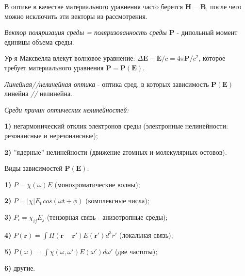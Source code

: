 В оптике в качестве материального уравнения часто берется $\mathbf{H}=\mathbf{B}$, после чего можно исключить эти векторы из рассмотрения.

\begin{to_def}
    \textit{Вектор поляризация среды = поляризованность среды $\mathbf{P}$} - дипольный момент единицы объема среды.
\end{to_def}

Ур-я Максвелла влекут волновое уравнение: $\Delta \mathbf{E}-\ddot{\mathbf{E}}/c=4\pi \mathbf{P}/c^{2}$, которое требует материального уравнения $\mathbf{P} = \mathbf{P}(\mathbf{E})$.

\begin{to_def}
    \textit{Линейная//нелинейная оптика} - оптика сред, в которых зависимость $\mathbf{P}(\mathbf{E})$ линейна \textit{//} нелинейна.
\end{to_def}

\textit{Среди причин оптических нелинейностей:} \\
    \par \textbf{1)} негармонический отклик электронов среды (электронные нелинейности: резонансные и нерезонансные); \\
    \par \textbf{2)} ''ядерные'' нелинейности (движение атомных и молекулярных остовов).


Виды зависимостей $\mathbf{P}(\mathbf{E})$: \\
     \par \textbf{1)} $P=\chi (\omega) E$ (монохроматические волны); \\
     \par \textbf{2)} $P=|\chi|E_{0}cos(\omega t + \phi)$ (комплексные числа); \\
     \par \textbf{3)} $P_{i}=\chi_{ij}E_{j}$ (тензорная связь - анизотропные среды); \\
     \par \textbf{4)} $P(\mathbf{r}) = \int H(\mathbf{r}-\mathbf{r}') E(\mathbf{r}') d^{3}r'$ (локальная связь); \\
     \par \textbf{5)} $P(\omega) = \int \chi (\omega, \omega') E(\omega') d\omega'$ (две частоты); \\
     \par \textbf{6)} другие.